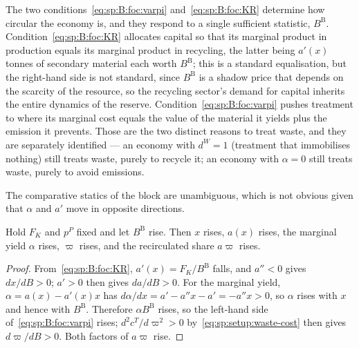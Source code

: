 \label{sec:sp:B:recycling}
The two conditions~\eqref{eq:sp:B:foc:varpi} and~\eqref{eq:sp:B:foc:KR} determine how circular the
economy is, and they respond to a single sufficient statistic, $B^{\mathrm B}$.
Condition~\eqref{eq:sp:B:foc:KR} allocates capital so that its marginal product in production equals
its marginal product in recycling, the latter being $a'(x)$ tonnes of secondary material each worth
$B^{\mathrm B}$; this is a standard equalisation, but the right-hand side is not standard, since
$B^{\mathrm B}$ is a shadow price that depends on the scarcity of the resource, so the recycling
sector's demand for capital inherits the entire dynamics of the reserve.
Condition~\eqref{eq:sp:B:foc:varpi} pushes treatment to where its marginal cost equals the value of
the material it yields plus the emission it prevents. Those are the two distinct reasons to treat
waste, and they are separately identified --- an economy with $d^W=1$ (treatment that immobilises
nothing) still treats waste, purely to recycle it; an economy with $\alpha=0$ still treats waste,
purely to avoid emissions.

The comparative statics of the block are unambiguous, which is not obvious given that $\alpha$ and
$a'$ move in opposite directions.

\begin{proposition}\label{prop:sp:B:circularity}
Hold $F_K$ and $p^P$ fixed and let $B^{\mathrm B}$ rise. Then $x$ rises, $a(x)$ rises, the marginal yield $\alpha$
rises, $\varpi$ rises, and the recirculated share $a\varpi$ rises.
\end{proposition}

\begin{proof}
From~\eqref{eq:sp:B:foc:KR}, $a'(x)=F_K/B^{\mathrm B}$ falls, and $a''<0$ gives $dx/dB>0$; $a'>0$ then gives
$da/dB>0$. For the marginal yield, $\alpha=a(x)-a'(x)x$ has $d\alpha/dx=a'-a''x-a'=-a''x>0$, so $\alpha$
rises with $x$ and hence with $B^{\mathrm B}$. Therefore $\alpha B^{\mathrm B}$ rises, so the left-hand side
of~\eqref{eq:sp:B:foc:varpi} rises; $d^2c^T/d\varpi^2>0$ by~\eqref{eq:sp:setup:waste-cost} then gives
$d\varpi/dB>0$. Both factors of $a\varpi$ rise.
\end{proof}

